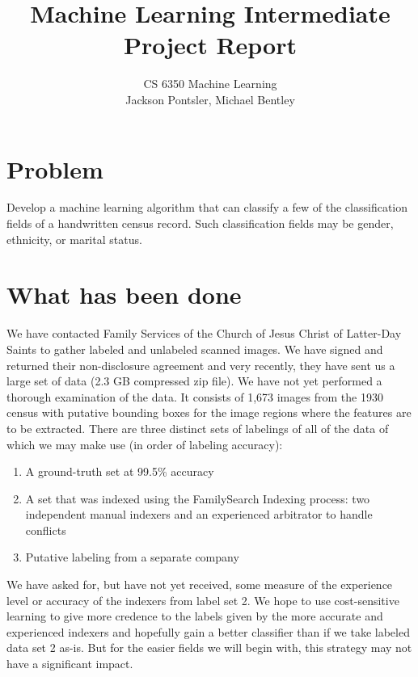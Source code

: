 \documentclass[12pt]{article}
\title{Machine Learning Intermediate Project Report}
\author{
  CS 6350 Machine Learning \\
  Jackson Pontsler, Michael Bentley
  }
\date{}
\begin{document}
\maketitle

\section{Problem}

Develop a machine learning algorithm that can classify a few of the classification fields of a handwritten census record.  Such classification fields may be gender, ethnicity, or marital status.

\section{What has been done}

We have contacted Family Services of the Church of Jesus Christ of Latter-Day Saints to gather labeled and unlabeled scanned images.  We have signed and returned their non-disclosure agreement and very recently, they have sent us a large set of data (2.3 GB compressed zip file).  We have not yet performed a thorough examination of the data.  It consists of 1,673 images from the 1930 census with putative bounding boxes for the image regions where the features are to be extracted.  There are three distinct sets of labelings of all of the data of which we may make use (in order of labeling accuracy):
\begin{enumerate}
  \item A ground-truth set at 99.5\% accuracy
  \item A set that was indexed using the FamilySearch Indexing process: two independent manual indexers and an experienced arbitrator to handle conflicts \cite{hansen2013quality}
  \item Putative labeling from a separate company
\end{enumerate}
We have asked for, but have not yet received, some measure of the experience level or accuracy of the indexers from label set 2.  We hope to use cost-sensitive learning to give more credence to the labels given by the more accurate and experienced indexers and hopefully gain a better classifier than if we take labeled data set 2 as-is.  But for the easier fields we will begin with, this strategy may not have a significant impact.
\end{document}
